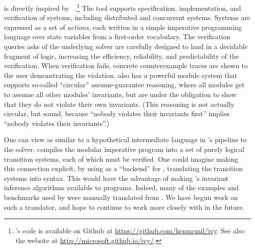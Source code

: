 \mypyvy is directly inspired by \ivy~\cite{Padon-al:PLDI16}.\footnote{
  \ivy's code is available on Github at \url{https://github.com/kenmcmil/ivy}.
  See also the \ivy website at \url{http://microsoft.github.io/ivy/}.
}
%
The \ivy tool supports specification, implementation, and verification of systems,
including distributed and concurrent systems.
%
Systems are expressed as a set of \emph{actions},
each written in a simple imperative programming language
over state variables from a first-order vocabulary.
%
The verification queries \ivy asks of the underlying solver
are carefully designed to land in a decidable fragment of logic,
increasing the efficiency, reliability, and predictability
of the verification.
%
When verification fails, concrete counterexample traces
are shown to the user demonstrating the violation.
%
\ivy{} also has a powerful module system
that supports so-called ``circular'' assume-guarantee reasoning,
where all modules get to assume all other modules' invariants,
but are under the obligation to show that they do not violate
their own invariants.
%
(This reasoning is not actually circular, but sound,
because ``nobody violates their invariants first''
implies ``nobody violates their invariants''.)

One can view \mypyvy as similar to a hypothetical intermediate language
in \ivy{}'s pipeline to the solver.
%
\ivy{} compiles the modular imperative program
into a set of purely logical transition systems,
each of which must be verified.
%
One could imagine making this connection explicit,
by using \mypyvy as a ``backend'' for \ivy,
translating the transition systems into \mypyvy syntax.
%
This would have the advantage of making
\mypyvy's invariant inference algorithms available
to \ivy programs.
%
Indeed, many of the examples and benchmarks used by \mypyvy
were manually translated from \ivy.
%
We have begun work on such a translator,
and hope to continue to work more closely with \ivy in the future.


